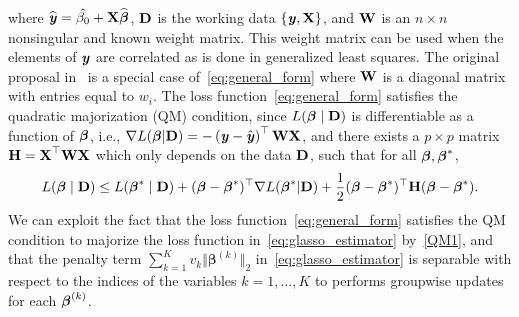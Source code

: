 where $\widehat{\textbf{\emph{y}}}=\hat{\beta_0}+\textbf{X}\widehat{\boldsymbol{\beta}}$, $\textbf{D}$ is the working data $\lbrace \textbf{\emph{y}}, \textbf{X} \rbrace$, and $\textbf{W}$ is an $n \times n$ nonsingular and known weight matrix. This weight matrix can be used when the elements of $\textbf{\emph{y}}$ are correlated as is done in generalized least squares. The original proposal in~\cite{yang2015fast} is a special case of~\eqref{eq:general_form} where $\textbf{W}$ is a diagonal matrix with entries equal to $w_i$. The loss function~\eqref{eq:general_form} satisfies the quadratic majorization (QM) condition, since $L(\boldsymbol{\beta}\mid\textbf{D})$ is differentiable as a function of $\boldsymbol{\beta}$, i.e., $\nabla L(\boldsymbol{\beta}|\textbf{D})=-\left(\textbf{\emph{y}}-\hat{\textbf{\emph{y}}}\right)^{\top}\mathbf{W}\textbf{X}$, and there exists
a $p\times p$ matrix $\textbf{H}=\textbf{X}^{\top}\mathbf{W}\textbf{X}$ which only depends on the data $\textbf{D}$, such that for all $\boldsymbol{\beta},\boldsymbol{\beta}^{*}$,
\begin{equation}
L(\boldsymbol{\beta}\mid\textbf{D})\le L(\boldsymbol{\beta}^{*}\mid\textbf{D})+(\boldsymbol{\beta}-\boldsymbol{\beta}^{*})^{\top}\nabla L(\boldsymbol{\beta}^{*}|\textbf{D})+\frac{1}{2}(\boldsymbol{\beta}-\boldsymbol{\beta}^{*})^{\top}\textbf{H}(\boldsymbol{\beta}-\boldsymbol{\beta}^{*}).\label{QM1}
\end{equation}
We can exploit the fact that the loss function~\eqref{eq:general_form} satisfies the QM condition to majorize the loss function in~\eqref{eq:glasso_estimator} by~\eqref{QM1}, and that the penalty term $\sum_{k=1}^{K}v_k\Vert\boldsymbol{\beta}^{(k)}\Vert_{2}$ in~\eqref{eq:glasso_estimator} is separable with respect to the indices of the variables $k=1, \ldots, K$ to performs groupwise updates for each $\boldsymbol{\beta}^{(k)}$. 

